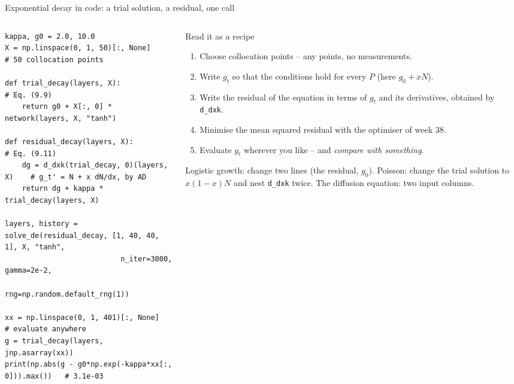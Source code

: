 \documentclass[10pt,aspectratio=169]{beamer}
\begin{document}
\begin{frame}[fragile]{Exponential decay in code: a trial solution, a residual, one call}
\begin{columns}[T]
\begin{column}{0.58\textwidth}
\lstset{basicstyle=\ttfamily\scriptsize}
\begin{lstlisting}
kappa, g0 = 2.0, 10.0
X = np.linspace(0, 1, 50)[:, None]          # 50 collocation points

def trial_decay(layers, X):                  # Eq. (9.9)
    return g0 + X[:, 0] * network(layers, X, "tanh")

def residual_decay(layers, X):               # Eq. (9.11)
    dg = d_dxk(trial_decay, 0)(layers, X)    # g_t' = N + x dN/dx, by AD
    return dg + kappa * trial_decay(layers, X)

layers, history = solve_de(residual_decay, [1, 40, 40, 1], X, "tanh",
                           n_iter=3000, gamma=2e-2,
                           rng=np.random.default_rng(1))

xx = np.linspace(0, 1, 401)[:, None]         # evaluate anywhere
g = trial_decay(layers, jnp.asarray(xx))
print(np.abs(g - g0*np.exp(-kappa*xx[:, 0])).max())   # 3.1e-03
\end{lstlisting}
\end{column}
\begin{column}{0.4\textwidth}
\begin{block}{Read it as a recipe}
\scriptsize
\begin{enumerate}
  \item Choose collocation points -- any points, no measurements.
  \item Write $g_t$ so that the conditions hold for every $P$ (here
        $g_0+xN$).
  \item Write the residual of the equation in terms of $g_t$ and its
        derivatives, obtained by \texttt{d\_dxk}.
  \item Minimise the mean squared residual with the optimiser of week 38.
  \item Evaluate $g_t$ wherever you like -- and \emph{compare with
        something}.
\end{enumerate}
\end{block}
\scriptsize
Logistic growth: change two lines (the residual, $g_0$).  Poisson: change
the trial solution to $x(1-x)N$ and nest \texttt{d\_dxk} twice.  The
diffusion equation: two input columns.
\end{column}
\end{columns}
\end{frame}
\end{document}
